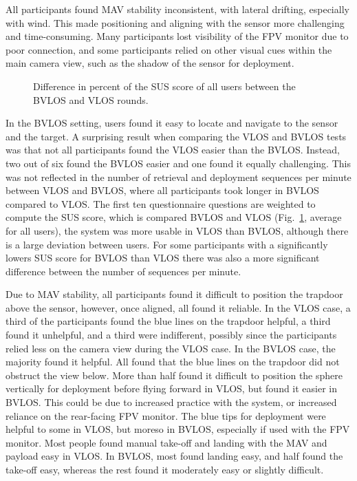 All participants found \ac{MAV} stability inconsistent, with lateral drifting, especially with wind. This made positioning and aligning with the sensor more challenging and time-consuming. Many participants lost visibility of the \ac{FPV} monitor due to poor connection, and some participants relied on other visual cues within the main camera view, such as the shadow of the sensor for deployment.


\begin{figure}[!t]
\centering

\caption{Difference in percent of the SUS score of all users between the \ac{BVLOS} and \ac{VLOS} rounds.}
\label{fig:fig6-bvlos-vlos}
\end{figure}

In the \ac{BVLOS} setting, users found it easy to locate and navigate to the sensor and the target. A surprising result when comparing the \ac{VLOS} and \ac{BVLOS} tests was that not all participants found the \ac{VLOS} easier than the \ac{BVLOS}. Instead, two out of six found the \ac{BVLOS} easier and one found it equally challenging. This was not reflected in the number of retrieval and deployment sequences per minute between \ac{VLOS} and \ac{BVLOS}, where all participants took longer in \ac{BVLOS} compared to \ac{VLOS}. The first ten questionnaire questions are weighted to compute the SUS score, which is compared \ac{BVLOS} and \ac{VLOS} (Fig.~\ref{fig:fig6-bvlos-vlos}, average for all users), the system was more usable in \ac{VLOS} than \ac{BVLOS}, although there is a large deviation between users. For some participants with a significantly lowers SUS score for \ac{BVLOS} than \ac{VLOS} there was also a more significant difference between the number of sequences per minute.

Due to \ac{MAV} stability, all participants found it difficult to position the trapdoor above the sensor, however, once aligned, all found it reliable. In the \ac{VLOS} case, a third of the participants found the blue lines on the trapdoor helpful, a third found it unhelpful, and a third were indifferent, possibly since the participants relied less on the camera view during the \ac{VLOS} case. In the \ac{BVLOS} case, the majority found it helpful. All found that the blue lines on the trapdoor did not obstruct the view below.
More than half found it difficult to position the sphere vertically for deployment before flying forward in \ac{VLOS}, but found it easier in \ac{BVLOS}. This could be due to increased practice with the system, or increased reliance on the rear-facing \ac{FPV} monitor.
The blue tips for deployment were helpful to some in \ac{VLOS}, but moreso in \ac{BVLOS}, especially if used with the \ac{FPV} monitor.
Most people found manual take-off and landing with the \ac{MAV} and payload easy in \ac{VLOS}. In \ac{BVLOS}, most found landing easy, and half found the take-off easy, whereas the rest found it moderately easy or slightly difficult.

